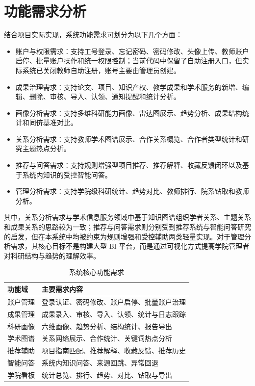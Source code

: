 \documentclass[12pt,a4paper]{ctexbook}
\begin{document}
\section{功能需求分析}
结合项目实际实现，系统功能需求可划分为以下几个方面：
\begin{itemize}
  \item 账户与权限需求：支持工号登录、忘记密码、密码修改、头像上传、教师账户启停、批量账户操作和统一权限控制；当前代码中保留了自助注册入口，但实际系统已关闭教师自助注册，账号主要由管理员创建。
  \item 成果治理需求：支持论文、项目、知识产权、教学成果和学术服务的新增、编辑、删除、审核、导入、认领、通知提醒和统计分析。
  \item 画像分析需求：支持多维科研能力画像、雷达图展示、趋势分析、成果结构统计和同侪基准对比。
  \item 关系分析需求：支持教师学术图谱展示、合作关系概览、合作者类型统计和研究主题热点分析。
  \item 推荐与问答需求：支持规则增强型项目推荐、推荐解释、收藏反馈闭环以及基于系统内知识的受控智能问答。
  \item 管理分析需求：支持学院级科研统计、趋势对比、教师排行、院系钻取和教师分析。
\end{itemize}

其中，关系分析需求与学术信息服务领域中基于知识图谱组织学者关系、主题关系和成果关系的思路较为一致\cite{academic_kg_service_2018}；推荐与问答需求则分别受到推荐系统与智能问答研究的启发，但在本系统中均被约束为规则增强和受控辅助两类轻量实现\cite{recsys_survey_cn_2022}\cite{qa_system_survey_2023}。对于管理分析需求，其核心目标不是构建大型 BI 平台，而是通过可视化方式提高学院管理者对科研结构与趋势的理解效率\cite{visual_analytics_2008}。

\begin{table}[H]
  \centering
  \caption{系统核心功能需求}
  \label{tab:functional-requirements}
  \begin{tabular}{p{3cm}p{9cm}}
    \toprule
    功能域 & 主要需求内容 \\
    \midrule
    账户管理 & 登录认证、密码修改、账户启停、批量账户治理 \\
    成果管理 & 成果录入、审核、导入、认领、统计与日志跟踪 \\
    科研画像 & 六维画像、趋势分析、结构统计、报告导出 \\
    学术图谱 & 关系网络展示、合作统计、关键词热点分析 \\
    推荐辅助 & 项目指南匹配、推荐解释、收藏反馈、推荐历史 \\
    智能问答 & 系统内知识问答、来源回跳、异常回退 \\
    学院看板 & 统计总览、排行、趋势、对比、钻取与导出 \\
    \bottomrule
  \end{tabular}
\end{table}
\end{document}
